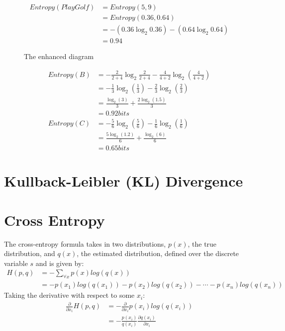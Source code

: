 \documentclass{article}
\begin{document}
\begin{align*}
    Entropy(Play Golf) &= Entropy(5,9) \\
    &= Entropy(0.36,0.64) \\
    &= -(0.36 \log_2 0.36) - (0.64 \log_2 0.64) \\
    &= 0.94
\end{align*}
\newpage  
\begin{figure}
  \centering
  
  \caption{The enhanced diagram}
\end{figure}
\begin{align*}
    Entropy(B) &= - \frac{2}{2+4} \log_2 \frac{2}{2+4} - \frac{4}{4+2} \log_2 (\frac{4}{4+2})\\
               &= -\frac{1}{3} \log_2(\frac{1}{3}) - \frac{2}{3} \log_2(\frac{2}{3}) \\
               &= \frac{\log_2(3)}{3} + \frac{2 \log_2(1.5)}{3} \\
               &= 0.92 bits\\ 
    Entropy(C) &= - \frac{5}{6} \log_2(\frac{5}{6}) - \frac{1}{6} \log_2(\frac{1}{6}) \\
               &= \frac{5 \log_2(1.2)}{6} + \frac{\log_2(6)}{6}\\
               &= 0.65 bits
\end{align*}
    
\section{Kullback-Leibler (KL) Divergence}




\section{Cross Entropy}
The cross-entropy formula takes in two distributions, $p(x)$, the true distribution, and $q(x)$, the estimated distribution, defined over the discrete variable $s$ and is given by:
\begin{align*}
    H(p,q)  &= - \sum_{\forall x} p(x) log(q(x)) \\
            &= -p(x_1)log(q(x_1))-p(x_2)log(q(x_2))- \cdots -p(x_n)log(q(x_n))
\end{align*}
Taking the derivative with respect to some $x_i$:
\begin{align*}
    \frac{\partial}{\partial x_i} H(p,q) &= - \frac{\partial}{\partial x_i} p(x_i) log(q(x_i)) \\
    &= - \frac{p(x_i)}{q(x_i)} \frac{\partial q(x_i)}{\partial x_i}
\end{align*}
\end{document}
